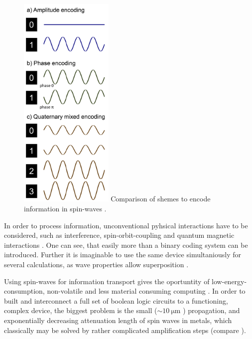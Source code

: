 \begin{figure}
    \centering
  \captionsetup{width=0.7\linewidth}
  \includegraphics[width=0.4\textwidth]{graphics/spin-code.png}
  {Comparison of shemes to encode information in spin-waves \cite{computing}.}  
  \label{fig:spin-coding}
\end{figure}

In order to process information, unconventional pyhsical interactions have to be considered, such as interference, spin-orbit-coupling and quantum magnetic interactions \cite{perovskite}.
One can see, that easily more than a binary coding system can be introduced. 
Further it is imaginable to use the same device simultaniously for several calculations, as wave properties allow superposition \cite{computing}.

Using spin-waves for information transport gives the oportuntity of low-energy-consumption, non-volatile and less material consuming computing \cite{clocks}. 
In order to built and interconnect a full set of boolean logic circuits to a functioning, complex device, the biggest problem is the small ($\sim\SI{10}{\micro\meter}$ \cite{computing}) propagation, and exponentially decreasing attenuation length of spin waves in metals, which classically may be solved by rather complicated amplification steps (compare \cite{clocks}).

